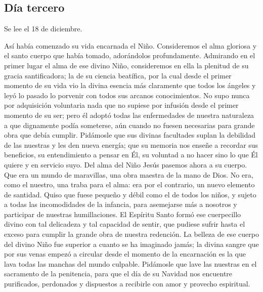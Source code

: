 \documentclass[spanish,utf8,twocolumn]{chlart}
\newenvironment{summary}{\begingroup
	\small\sffamily\itshape%
	\setlength{\leftskip}{3em}\setlength{\rightskip}{3em}\noindent
	}{\par\endgroup}
\newenvironment{lectura}{\begingroup\color{lector}}{\endgroup\par}
\begin{document}
\subsection*{Día tercero}
\begin{summary}
Se lee el 18 de diciembre.
\end{summary}
\begin{lectura}
Así había comenzado su vida encarnada el Niño.
Consideremos el alma gloriosa y el santo cuerpo que había tomado,
adorándolos profundamente.
Admirando en el primer lugar el alma de ese divino Niño, consideremos en
ella la plenitud de su gracia santificadora; la de su ciencia beatífica,
por la cual desde el primer momento de su vida vio la divina esencia más
claramente que todos los ángeles y leyó lo pasado lo porvenir con todos
sus arcanos conocimientos.
No supo nunca por adquisición voluntaria nada que no supiese por
infusión desde el primer momento de su ser; pero él adoptó todas las
enfermedades de nuestra naturaleza a que dignamente podía someterse, aún
cuando no fuesen necesarias para grande obra que debía cumplir.
Pidámosle que sus divinas facultades suplan la debilidad de las nuestras
y les den nueva energía; que su memoria nos enseñe a recordar sus
beneficios, su entendimiento a pensar en Él, su voluntad a no hacer sino
lo que Él quiere y en servicio suyo.
Del alma del Niño Jesús pasemos ahora a su cuerpo.
Que era un mundo de maravillas, una obra maestra de la mano de Dios.
No era, como el nuestro, una traba para el alma:
era por el contrario, un nuevo elemento de santidad.
Quiso que fuese pequeño y débil como el de todos los niños, y sujeto a
todas las incomodidades de la infancia, para asemejarse más a nosotros y
participar de nuestras humillaciones.
El Espíritu Santo formó ese cuerpecillo divino con tal delicadeza y tal
capacidad de sentir, que pudiese sufrir hasta el exceso para cumplir la
grande obra de nuestra redención.
La belleza de ese cuerpo del divino Niño fue superior a cuanto se ha
imaginado jamás; la divina sangre que por sus venas empezó a circular
desde el momento de la encarnación es la que lava todas las manchas del
mundo culpable.
Pidámosle que lave las nuestras en el sacramento de la penitencia, para
que el día de su Navidad nos encuentre purificados, perdonados y
dispuestos a recibirle con amor y provecho espiritual.
\end{lectura}
\end{document}
